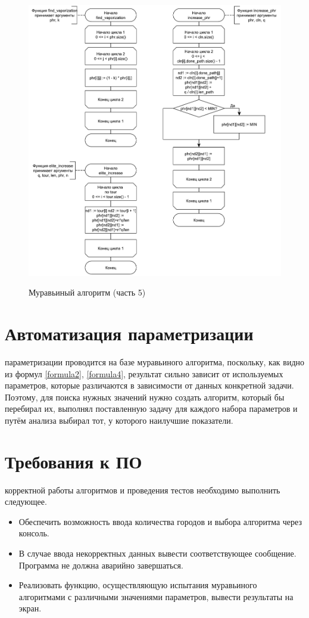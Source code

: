 \begin{figure}[h]
	\begin{center}
		{\includegraphics[scale = 0.6]{schemes/ant5}}
		\caption{Муравьиный алгоритм (часть 5)}
		\label{fig7:image}
	\end{center}
\end{figure}

\section{Автоматизация параметризации}
 параметризации проводится на базе муравьиного алгоритма, поскольку, как видно из формул \ref{formula2}, \ref{formula4}, результат сильно зависит от используемых параметров, которые различаются в зависимости от данных конкретной задачи. Поэтому, для поиска нужных значений нужно создать алгоритм, который бы перебирал их, выполнял поставленную задачу для каждого набора параметров и путём анализа выбирал тот, у которого наилучшие показатели.

\section{Требования к ПО}
 корректной работы алгоритмов и проведения тестов необходимо выполнить следующее.
\begin{itemize}
	\item Обеспечить возможность ввода количества городов и выбора алгоритма через консоль.
	\item В случае ввода некорректных данных вывести соответствующее сообщение. Программа не должна аварийно завершаться.
	\item Реализовать функцию, осуществляющую испытания муравьиного алгоритмами с различными значениями параметров, вывести результаты на экран.
\end{itemize}

